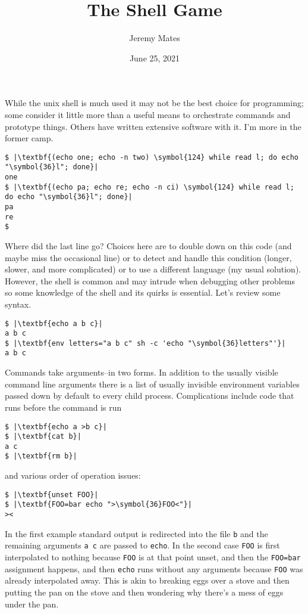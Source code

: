 \documentclass[10pt,a4paper]{article}
\title{The Shell Game}
\author{Jeremy Mates}
\date{June 25, 2021}
\begin{document}
\renewcommand{\thefootnote}{\alph{footnote}}

\maketitle

While the unix shell is much used it may not be the best choice for
programming; some consider it little more than a useful means to
orchestrate commands and prototype things. Others have written extensive
software with it. I'm more in the former camp.

\begin{lstlisting}
$ |\textbf{(echo one; echo -n two) \symbol{124} while read l; do echo "\symbol{36}l"; done}|
one
$ |\textbf{(echo pa; echo re; echo -n ci) \symbol{124} while read l; do echo "\symbol{36}l"; done}|
pa
re
$ 
\end{lstlisting}

Where did the last line go? Choices here are to double down on this code
(and maybe miss the occasional line) or to detect and handle this
condition (longer, slower, and more complicated) or to use a different
language (my usual solution). However, the shell is common and may
intrude when debugging other problems so some knowledge of the shell and
its quirks is essential. Let's review some syntax.

\begin{lstlisting}
$ |\textbf{echo a b c}|
a b c
$ |\textbf{env letters="a b c" sh -c 'echo "\symbol{36}letters"'}|
a b c
\end{lstlisting}

Commands take arguments--in two forms. In addition to the usually
visible command line arguments there is a list of usually invisible
environment variables passed down by default to every child process.
Complications include code that runs before the command is run

\begin{lstlisting}
$ |\textbf{echo a >b c}|
$ |\textbf{cat b}|
a c
$ |\textbf{rm b}|
\end{lstlisting}

and various order of operation issues:

\begin{lstlisting}
$ |\textbf{unset FOO}|
$ |\textbf{FOO=bar echo ">\symbol{36}FOO<"}|
><
\end{lstlisting}

In the first example standard output is redirected into the file
\texttt{b} and the remaining arguments \texttt{a c} are passed to
\texttt{echo}. In the second case \texttt{FOO} is first
interpolated to nothing because \texttt{FOO} is at that point unset, and
then the \texttt{FOO=bar} assignment happens, and then \texttt{echo}
runs without any arguments because \texttt{FOO} was already
interpolated away. This is akin to breaking eggs over a stove and then
putting the pan on the stove and then wondering why there's a mess of
eggs under the pan. \\
\end{document}
